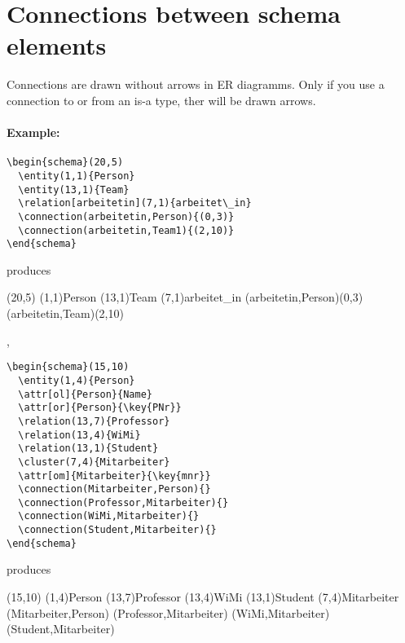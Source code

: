 \documentclass[a4paper,11pt]{article}
\begin{document}
\section{Connections between schema elements}

Connections are drawn without arrows in ER diagramms. Only if you use a 
connection to or from an is-a type, ther will be drawn arrows.

\paragraph{Example:}

\begin{verbatim}
\begin{schema}(20,5)
  \entity(1,1){Person}
  \entity(13,1){Team}
  \relation[arbeitetin](7,1){arbeitet\_in}
  \connection(arbeitetin,Person){(0,3)}
  \connection(arbeitetin,Team1){(2,10)}
\end{schema}
\end{verbatim}

produces

\begin{schema}(20,5)
  \entity(1,1){Person}
  \entity(13,1){Team}
  \relation[arbeitetin](7,1){arbeitet\_in}
  \connection(arbeitetin,Person){(0,3)}
  \connection(arbeitetin,Team){(2,10)}
\end{schema}

, 

\begin{verbatim}
\begin{schema}(15,10)
  \entity(1,4){Person}
  \attr[ol]{Person}{Name}
  \attr[or]{Person}{\key{PNr}}
  \relation(13,7){Professor}
  \relation(13,4){WiMi}
  \relation(13,1){Student}
  \cluster(7,4){Mitarbeiter}
  \attr[om]{Mitarbeiter}{\key{mnr}}
  \connection(Mitarbeiter,Person){}
  \connection(Professor,Mitarbeiter){}
  \connection(WiMi,Mitarbeiter){}
  \connection(Student,Mitarbeiter){}
\end{schema}
\end{verbatim}

produces

\begin{schema}(15,10)
  \entity(1,4){Person}
  \relation(13,7){Professor}
  \relation(13,4){WiMi}
  \relation(13,1){Student}
  \cluster(7,4){Mitarbeiter}
  \connection(Mitarbeiter,Person){}
  \connection(Professor,Mitarbeiter){}
  \connection(WiMi,Mitarbeiter){}
  \connection(Student,Mitarbeiter){}
\end{schema}
\end{document}
